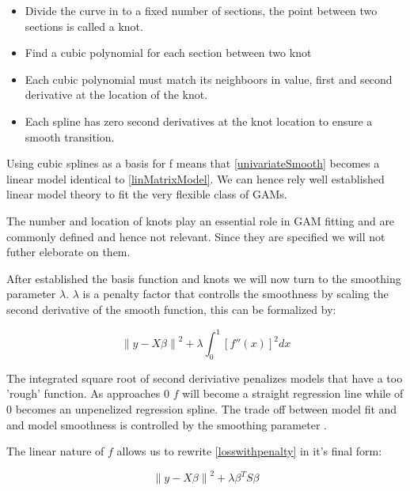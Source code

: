 \documentclass{article}
\begin{document}
    \begin{itemize}

    \item Divide the curve in to a fixed number of sections, the point between two sections is called a knot.
    \item Find a cubic polynomial for each section between two knot
    \item Each cubic polynomial must match its neighboors in value, first and second derivative at the location of the knot.
    \item Each spline has zero second derivatives at the knot location to ensure a smooth transition.

    \end{itemize}

    Using cubic splines as a basis for f means that \ref{univariateSmooth} becomes a linear model identical to \ref{linMatrixModel}. We can hence rely well established linear model theory to fit the very flexible class of GAMs.

    The number and location of knots play an essential role in GAM fitting and are commonly defined and hence not relevant. Since they are specified we will not futher eleborate on them.

    After established the basis function and knots we will now turn to the smoothing parameter $\lambda$. $\lambda$ is a penalty factor that controlls the smoothness by scaling the second derivative of the smooth function, this can be formalized by:

    \begin{equation} \label{losswithpenalty} \left \| y - X\beta  \right \|^2 + \lambda \int_{0}^{1} [{f}''(x)]^2 dx \end{equation}

    The integrated square root of second deriviative penalizes models that have a too 'rough' function. As \textlambda approaches 0 $f$ will become a straight regression line while \textlambda of 0 becomes an unpenelized regression spline. The trade off between model fit and and model smoothness is controlled by the smoothing parameter \textlambda.

    The linear nature of $f$ allows us to rewrite \ref{losswithpenalty} in it's final form:

    \begin{equation} \label{FINALSMOOTH} \left \| y - X\beta  \right \|^2 + \lambda \beta^T S\beta  \end{equation}
\end{document}
